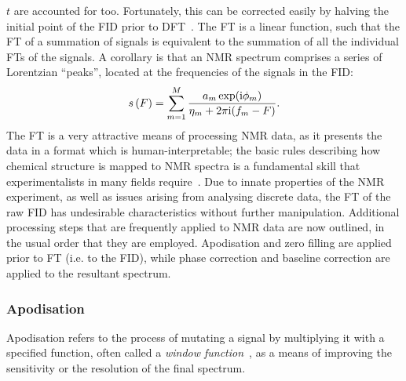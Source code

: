 $t$ are accounted for too. Fortunately, this can be corrected easily by
halving the initial point of the \ac{FID} prior to \ac{DFT}~\cite{Tang1994}.
The \ac{FT} is a linear function, such that the
\ac{FT} of a summation of signals is equivalent to the summation of all
the individual \ac{FT}s of the signals. A corollary is that an \ac{NMR}
spectrum comprises a series of Lorentzian ``peaks'', located at the frequencies
of the signals in the \ac{FID}:
\begin{equation}
    s\left(F\right) = \sum_{m=1}^{M}
    \frac{\amexpphim}
    {\eta_m + 2 \pi \iu (f_m - F)}.
    \label{eq:ft-summation}%
\end{equation}
The \ac{FT} is a very attractive means of processing \ac{NMR} data, as it
presents the data in a format which is human-interpretable; the basic
rules describing how chemical structure is mapped to \ac{NMR} spectra
is a fundamental skill that experimentalists in many fields
require~\cite{Hore2015b}.
Due to innate properties of the \ac{NMR} experiment,
as well as issues arising from analysing discrete data, the \ac{FT} of
the raw \ac{FID} has undesirable
characteristics without further manipulation. Additional processing
steps that are frequently applied to \ac{NMR} data are now outlined, in the
usual order that they are employed. Apodisation and zero filling
are applied prior to \ac{FT} (i.e. to the \ac{FID}), while phase
correction and baseline correction are applied to the resultant spectrum.

\subsubsection{Apodisation}
Apodisation refers to the process of mutating a signal by multiplying it with a
specified function, often called a \emph{window function}~\cite[Section
3.2.7]{Claridge2016}, as a means of improving the sensitivity or the
resolution of the final spectrum.

